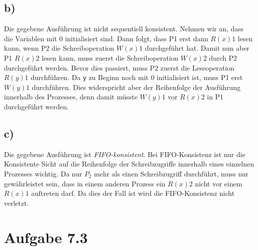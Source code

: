 \documentclass[a4paper,
12pt,
BCOR12mm,
]{scrartcl}
\theoremstyle{break}
\begin{document}
\subsection*{b)}
Die gegebene Ausführung ist nicht sequentiell konsistent. Nehmen wir an, dass die
Variablen mit 0 initialisiert sind. Dann folgt, dass P1 erst dann $R(x)1$ lesen kann, wenn
P2 die Schreiboperation $W(x)1$ durchgeführt hat. Damit nun aber P1 $R(x)2$ lesen kann,
muss zuerst die Schreiboperation $W(x)2$ durch P2 durchgeführt werden. Bevor dies
passiert, muss P2 zuerst die Leseoperation $R(y)1$ durchführen. Da \verb|y| zu Beginn noch
mit 0 initialisiert ist, muss P1 erst $W(y)1$ durchführen. Dies widerspricht aber der
Reihenfolge der Ausführung innerhalb des Prozesses, denn damit müsste $W(y)1$ vor $R(x)2$
in P1 durchgeführt werden.
\subsection*{c)}
Die gegebene Ausführung ist \emph{FIFO-konsistent}. Bei FIFO-Konsistenz ist nur die
Konsistente Sicht auf die Reihenfolge der Schreibzugriffe innerhalb eines einzelnen
Prozesses wichtig. Da nur $P_2$ mehr als einen Schreibzugriff durchführt, muss nur
gewährleistet sein, dass in einem anderen Prozess ein $R(x)2$ nicht vor einem $R(x)1$
auftreten darf. Da dies der Fall ist wird die FIFO-Konsistenz nicht verletzt.

\section*{Aufgabe 7.3}
\end{document}
